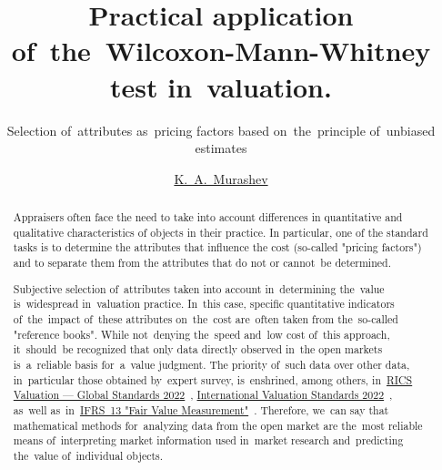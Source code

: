 \documentclass[]{scrreprt}
\title{Practical application of~the~Wilcoxon-Mann-Whitney test in~valuation.}
\subtitle{Selection of~attributes as~pricing factors based on~the~principle of~unbiased estimates}
\author{\href{https://www.facebook.com/groups/1977067932456703}{K.~A.~Murashev}}
\begin{document}
\maketitle
%
%	
\begin{abstract}
	Appraisers often face the need to take into account differences in quantitative and qualitative characteristics of objects in their practice. In particular, one of the standard tasks is to determine the attributes that influence the cost (so-called "pricing factors") and to separate them from the attributes that do not or cannot~be determined.
	
	Subjective selection of~attributes taken into account in~determining the~value is~widespread in~valuation practice. In~this case, specific quantitative indicators of~the~impact of~these attributes on~the~cost are~often taken from the~so-called "reference books". While not~denying the~speed and~low cost of~this approach, it~should~be recognized that only data directly observed in~the open markets is~a~reliable basis for~a~value judgment. The priority of~such data over other data, in~particular those obtained by~expert survey, is~enshrined, among others, in~\href{https://www.rics.org/uk/upholding-professional-standards/sector-standards/valuation/red-book/red-book-global/}{RICS Valuation --- Global Standards 2022}~\cite{RVGS-2022}, \href{https://www.rics.org/uk/upholding-professional-standards/sector-standards/valuation/red-book/international-valuation-standards/}{International Valuation Standards 2022}~\cite{IVS-2022}, as~well as~in~\href{http://eifrs.ifrs.org/eifrs/bnstandards/en/IFRS13.pdf}{IFRS~13 "Fair Value Measurement"}~\cite{IFRS-13}. Therefore, we~can say that mathematical methods for~analyzing data from the open market are the~most reliable means of~interpreting market information used in~market research and~predicting the~value of~individual objects.
	

\end{abstract}
\end{document}
